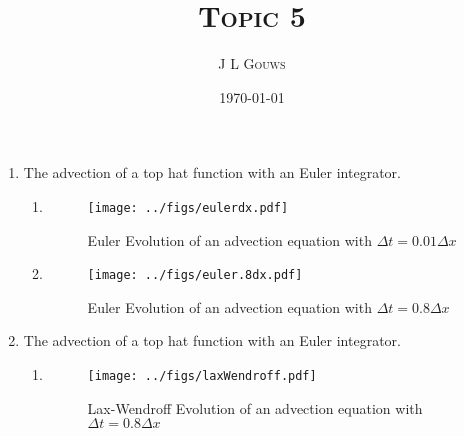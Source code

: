 \documentclass[12pt,a4]{article}
\title{
\textsc{Topic 5}
}
\author{\textsc{J L Gouws}
}
\date{\today
\\[1cm]}
\begin{document}
\thispagestyle{empty}

\maketitle

\begin{enumerate}
  \item
    The advection of a top hat function with an Euler integrator.
    \begin{enumerate}
      \item
        \begin{figure}[H]
          \centering
          \texttt{[image: ../figs/eulerdx.pdf]}
          \caption{Euler Evolution of an advection equation with $\Delta t = 0.01 \Delta x$}
        \end{figure}
      \item
        \begin{figure}[H]
          \centering
          \texttt{[image: ../figs/euler.8dx.pdf]}
          \caption{Euler Evolution of an advection equation with $\Delta t = 0.8 \Delta x$}
        \end{figure}
    \end{enumerate}
  \item
    The advection of a top hat function with an Euler integrator.
    \begin{enumerate}
      \item
        \begin{figure}[H]
          \centering
          \texttt{[image: ../figs/laxWendroff.pdf]}
          \caption{Lax-Wendroff Evolution of an advection equation with $\Delta t = 0.8 \Delta x$}
        \end{figure}
    \end{enumerate}
\end{enumerate}
\end{document}
